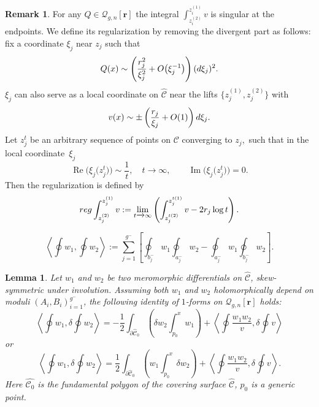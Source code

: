 \documentclass[10pt,a4paper]{article}
\numberwithin{equation}{section}
\newtheorem{Lemma}[Theorem]{Lemma}
\theoremstyle{definition}
\newtheorem{Remark}[Theorem]{Remark}
\begin{document}
\begin{Remark}
For any $Q \in \mathcal{Q}_{g,n}[\mathbf{r}]$ the integral $\int^{z^{(1)}_i}_{z^{(2)}_i} v$ is singular at the endpoints. We define its regularization by removing the divergent part as follows: fix a coordinate $\xi_j$ near $z_j$ such that
\begin{equation*}%
Q(x) \sim \left(\frac{r_j^2}{\xi_j^2} +O\big(\xi_j^{-1}\big)\right)({\rm d} \xi_j)^2.\end{equation*}
$\xi_j$ can also serve as a local coordinate on $\hat{\mathcal{C}}$ near the lifts $\big\{ {z^{(1)}_j}, {z^{(2)}_j}\big\}$ with
\begin{equation*}%
v(x)\sim \pm \left(\frac{ r_j}{\xi_j} +O(1)\right){\rm d} \xi_j.\end{equation*}
Let $z^t_j$ be an arbitrary sequence of points on $\mathcal{C}$ converging to $z_j,$ such that in the local coordinate~$\xi_j$
\begin{equation*}%
\operatorname{Re} \big(\xi_j\big(z^t_j\big)\big) \sim \frac{1}{t}, \quad t \xrightarrow{} \infty, \qquad \operatorname{Im} \big(\xi_j\big(z^t_j\big)\big)=0.\end{equation*}
Then the regularization is defined by
\begin{equation}\label{76}
{\rm reg}\int^{z^{(1)}_j}_{z^{(2)}_j}v := \lim_{t \xrightarrow{} \infty } \left( \int^{z^{t (1)}_j}_{z^{t (2)}_j}v - 2 r_j \log t \right).
\end{equation}
\end{Remark}

\begin{equation}\label{77} \left\langle\oint w_1,\oint w_2 \right\rangle:=\sum^{g^-}_{j=1}\left[\oint_{b^-_j}w_1 \oint_{a^-_j}w_2 - \oint_{a^-_j}w_1 \oint_{b^-_j}w_2\right].\end{equation}

\begin{Lemma} \label{Lem_1}
Let $w_1$ and $w_2$ be two meromorphic differentials on $\hat{\mathcal{C}}$, skew-symmetric under involution. Assuming both $w_1$ and $w_2$ holomorphically depend on moduli $(A_i, B_i)^{g^-}_{i=1}$, the following identity of $1$-forms on $\mathcal{Q}_{g,n}[\textbf{r}]$ holds:
\begin{equation}\label{78}\left\langle \oint w_1, \delta \oint w_2\right\rangle =-\frac{1}{2}\int_{\partial \hat{\mathcal{C}}_0}\left(\delta w_2
\int^x_{p_0} w_1\right)+\left\langle \oint \frac{w_1 w_2}{v},\delta \oint v\right\rangle \end{equation} or
\begin{equation}\label{79}\left\langle \oint w_1, \delta \oint w_2\right\rangle =\frac{1}{2}\int_{\partial \hat{\mathcal{C}}_0}\left( w_1
\int^x_{p_0} \delta w_2\right)+\left\langle \oint\frac{w_1 w_2}{v},\delta \oint v\right\rangle. \end{equation}
Here $\hat{\mathcal{C}_0}$ is the fundamental polygon of the covering surface $\hat{\mathcal{C}}$, $p_0$ is a generic point.
\end{Lemma}
\end{document}
